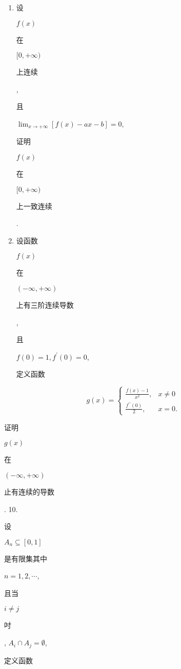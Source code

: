 \documentclass[10pt]{article}
\begin{document}
\begin{enumerate}
  \item \begin{CJK}{UTF8}{mj}设\end{CJK} $f(x)$ \begin{CJK}{UTF8}{mj}在\end{CJK} $[0,+\infty)$ \begin{CJK}{UTF8}{mj}上连续\end{CJK}, \begin{CJK}{UTF8}{mj}且\end{CJK} $\lim _{x \rightarrow+\infty}[f(x)-a x-b]=0$, \begin{CJK}{UTF8}{mj}证明\end{CJK} $f(x)$ \begin{CJK}{UTF8}{mj}在\end{CJK} $[0,+\infty)$ \begin{CJK}{UTF8}{mj}上一致连续\end{CJK}.

  \item \begin{CJK}{UTF8}{mj}设函数\end{CJK} $f(x)$ \begin{CJK}{UTF8}{mj}在\end{CJK} $(-\infty,+\infty)$ \begin{CJK}{UTF8}{mj}上有三阶连续导数\end{CJK}, \begin{CJK}{UTF8}{mj}且\end{CJK} $f(0)=1, f^{\prime}(0)=0$, \begin{CJK}{UTF8}{mj}定义函数\end{CJK}

\end{enumerate}
$$
g(x)= \begin{cases}\frac{f(x)-1}{x^{2}}, & x \neq 0 \\ \frac{f^{\prime \prime}(0)}{2}, & x=0 .\end{cases}
$$
\begin{CJK}{UTF8}{mj}证明\end{CJK} $g(x)$ \begin{CJK}{UTF8}{mj}在\end{CJK} $(-\infty,+\infty)$ \begin{CJK}{UTF8}{mj}止有连续的导数\end{CJK}. 10. \begin{CJK}{UTF8}{mj}设\end{CJK} $A_{n} \subseteq[0,1]$ \begin{CJK}{UTF8}{mj}是有限集其中\end{CJK} $n=1,2, \cdots$, \begin{CJK}{UTF8}{mj}且当\end{CJK} $i \neq j$ \begin{CJK}{UTF8}{mj}吋\end{CJK}, $A_{i} \cap A_{j}=\emptyset$, \begin{CJK}{UTF8}{mj}定义函数\end{CJK}
\end{document}
